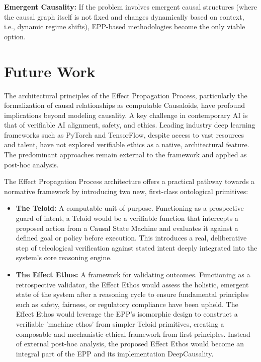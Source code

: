 \documentclass{article}
\begin{document}
\textbf{Emergent Causality:} If the problem involves emergent causal structures (where the causal graph itself is not fixed and changes dynamically based on context, i.e., dynamic regime shifts), EPP-based methodologies become the only viable option.


\newpage

\section{Future Work}
\label{sec:future_work}

The architectural principles of the Effect Propagation Process, particularly the formalization of causal relationships
as computable Causaloids, have profound implications beyond modeling causality. A key challenge in contemporary AI is
that of verifiable AI alignment, safety, and ethics. Leading industry deep learning frameworks such as PyTorch and
TensorFlow, despite access to vast resources and talent, have not explored verifiable ethics as a native, architectural
feature. The predominant approaches remain external to the framework and applied as post-hoc analysis.

The Effect Propagation Process architecture offers a practical pathway towards a normative framework by introducing two
new, first-class ontological primitives:

\begin{itemize}
    \item \textbf{The Teloid:} A computable unit of purpose. Functioning as a prospective guard of intent, a Teloid would be a
  verifiable function that intercepts a proposed action from a Causal State Machine and evaluates it against a defined
  goal or policy before execution. This introduces a real, deliberative step of teleological verification against stated
  intent deeply integrated into the system's core reasoning engine.
    \item \textbf{The Effect Ethos:}  A framework for validating outcomes. Functioning as a retrospective validator, the Effect Ethos
  would assess the holistic, emergent state of the system after a reasoning cycle to ensure fundamental principles such
  as safety, fairness, or regulatory compliance have been upheld. The Effect Ethos would leverage the EPP's isomorphic
  design to construct a verifiable 'machine ethos' from simpler Teloid primitives, creating a composable and mechanistic
  ethical framework from first principles. Instead of external post-hoc analysis, the proposed Effect Ethos would become
  an integral part of the EPP and its implementation DeepCausality.
\end{itemize}
\end{document}
